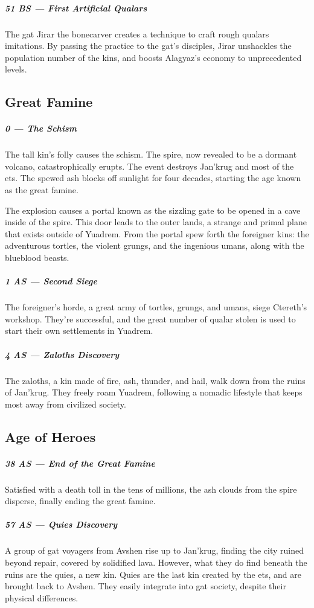 \begin{linenumbers}
\subparagraph{51 BS --- First Artificial Qualars} The gat Jirar the bonecarver creates a technique to craft rough qualars imitations.
By passing the practice to the gat's disciples, Jirar unshackles the population number of the kins, and boosts Alagyaz's economy to unprecedented levels.

\subsection*{Great Famine}
\subparagraph{0 --- The Schism} The tall kin's folly causes the schism.
The spire, now revealed to be a dormant volcano, catastrophically erupts.
The event destroys Jan'krug and most of the ets.
The spewed ash blocks off sunlight for four decades, starting the age known as the great famine.

The explosion causes a portal known as the sizzling gate to be opened in a cave inside of the spire.
This door leads to the outer lands, a strange and primal plane that exists outside of Yuadrem.
From the portal spew forth the foreigner kins: the adventurous tortles, the violent grungs, and the ingenious umans, along with the blueblood beasts.

\subparagraph{1 AS --- Second Siege} The foreigner's horde, a great army of tortles, grungs, and umans, siege Ctereth's workshop.
They're successful, and the great number of qualar stolen is used to start their own settlements in Yuadrem.

\subparagraph{4 AS --- Zaloths Discovery} The zaloths, a kin made of fire, ash, thunder, and hail, walk down from the ruins of Jan'krug.
They freely roam Yuadrem, following a nomadic lifestyle that keeps most away from civilized society.

\subsection*{Age of Heroes}
\subparagraph{38 AS --- End of the Great Famine} Satisfied with a death toll in the tens of millions, the ash clouds from the spire disperse, finally ending the great famine.

\subparagraph{57 AS --- Quies Discovery} A group of gat voyagers from Avshen rise up to Jan'krug, finding the city ruined beyond repair, covered by solidified lava.
However, what they do find beneath the ruins are the quies, a new kin.
Quies are the last kin created by the ets, and are brought back to Avshen.
They easily integrate into gat society, despite their physical differences.


\end{linenumbers}
